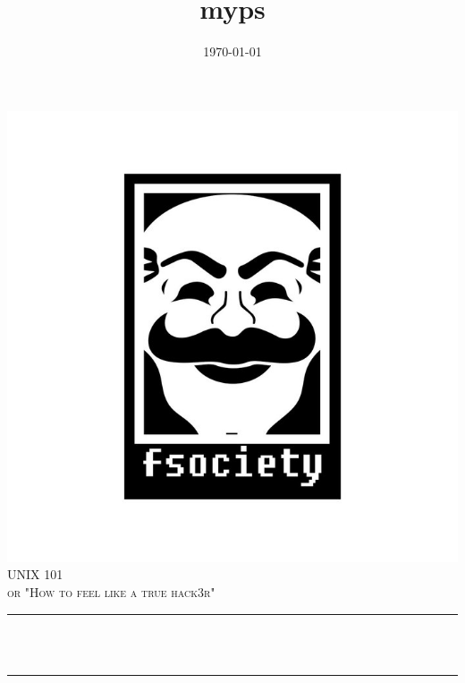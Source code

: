 \documentclass[12pt]{article}
\title{myps}								%
\date{\today}											%
\makeatletter
\let\thetitle\@title
\let\thedate\@date
\makeatother
\begin{document}

\begin{titlepage}
	\centering
    \vspace*{0.5 cm}
    \includegraphics[scale = 0.3]{resources/logo4.png}\\[1.0 cm]
    \textsc{\LARGE \newline\newline UNIX 101}\\[2.0 cm]
	\textsc{\Large or "How to feel like a true hack3r"}\\[0.5 cm]
	\rule{\linewidth}{0.2 mm} \\[0.4 cm]
	{ \huge \bfseries \thetitle}\\
	\rule{\linewidth}{0.2 mm} \\[1.5 cm]
	
    \thedate
    
    
    
	
\end{titlepage}


\tableofcontents
\pagebreak

\end{document}
